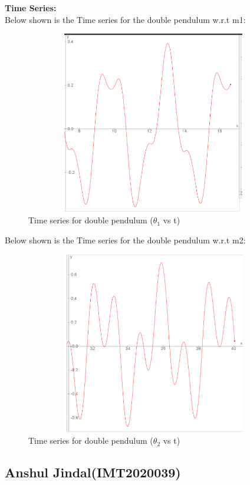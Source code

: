 \documentclass[11pt]{scrartcl} %
\begin{document}
\newpage
\textbf{Time Series:}\\
Below shown is the Time series for the double pendulum w.r.t m1:
\begin{figure}[h] %
	\centering
	\includegraphics[width=12cm, height=8cm]{Figures/M 4b angle 1.png} %
	\caption{Time series for double pendulum ($\theta_{1}$ vs t)}
\end{figure}

Below shown is the Time series for the double pendulum w.r.t m2:
\begin{figure}[h] %
	\centering
	\includegraphics[width=12cm, height=8cm]{Figures/M 4b angle 2.png} %
	\caption{Time series for double pendulum ($\theta_{2}$ vs t)}
\end{figure}

\newpage
\subsection{Anshul Jindal(IMT2020039)}
\end{document}
